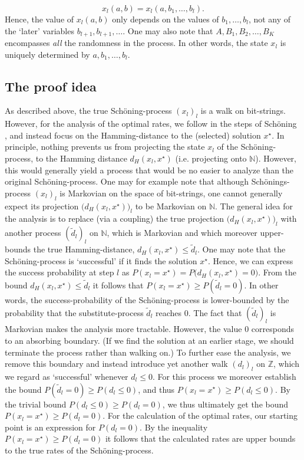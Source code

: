 \documentclass[a4paper,aps,floatfix]{revtex4}
\begin{document}
\begin{equation}
x_l(a,b) = x_l(a,b_1,\ldots,b_{l}).
\end{equation}
Hence, the value of $x_l(a,b)$ only depends on the values of $b_1,\ldots, b_l$, not any of the `later' variables $b_{l+1},b_{l+1},\ldots$.
One may also note that $A,B_1,B_2,\ldots, B_K$ encompasses \emph{all} the randomness in the process. In other words, the state $x_l$ is uniquely determined by $a,b_1,\ldots,b_{l}$.


\subsection{The proof idea}

As described above, the true Sch\"oning-process $(x_l)_l$ is a walk on bit-strings. However, for the analysis of the optimal rates, we follow in the steps of  Sch\"oning \cite{Schoening99,SchoeningToranBook}, and instead focus on the Hamming-distance to the (selected) solution $x^{\star}$. In principle, nothing prevents us from projecting the state $x_l$ of the  Sch\"oning-process, to the Hamming distance $d_H(x_l,x^{\star})$ (i.e. projecting onto $\mathbb{N}$). However, this would generally yield a  process that would be no easier to analyze than the original Sch\"oning-process. One may for example note that although Sch\"onings-process  $(x_l)_l$ is Markovian on the space of bit-strings, one cannot generally expect its projection $\big(d_H(x_l,x^{\star})\big)_l$ to be Markovian on $\mathbb{N}$. The general idea for the analysis is to replace (via  a coupling) the true projection   $\big(d_H(x_l,x^{\star})\big)_l$ with another process $(\tilde{d}_l)_l$ on $\mathbb{N}$, which is Markovian and which moreover upper-bounds the true Hamming-distance, $d_H(x_l,x^{\star})\leq \tilde{d}_l$. One may note that the Sch\"oning-process is `successful' if it finds the solution $x^{\star}$. Hence,  we can express the success probability at step $l$ as $P(x_l = x^{\star}) = P\big(d_H(x_l,x^{\star}) = 0\big)$. From the bound $d_H(x_l,x^{\star})\leq \tilde{d}_l$ it follows that 
$P(x_l = x^{\star}) \geq  P(\tilde{d}_l = 0)$. In other words, the success-probability of the Sch\"oning-process is lower-bounded by the probability that the substitute-process $\tilde{d}_l$ reaches $0$. The fact that $(\tilde{d}_l)_l$ is Markovian makes the analysis more tractable. However, the value $0$ corresponds to an absorbing boundary. (If we find the solution at an earlier stage, we should terminate the process rather than walking on.) To further ease the analysis, we remove this boundary and instead introduce yet another walk $(d_l)_l$ on $\mathbb{Z}$, which we regard as `successful' whenever $d_l\leq 0$. For this process we moreover establish the bound $P(\tilde{d}_l = 0)\geq P(d_l\leq 0)$, and thus $P(x_l = x^{\star})\geq P(d_l\leq 0)$. By the trivial bound $P(d_l\leq 0)\geq P(d_l = 0)$, we thus ultimately get the bound  $P(x_l = x^{\star})\geq P(d_l =  0)$. For the calculation of the optimal rates, our starting point is an expression for $P(d_l =  0)$. By the inequality $P(x_l = x^{\star})\geq P(d_l =  0)$ it follows that the calculated rates are upper bounds to the true rates of the Sch\"oning-process.
\end{document}
